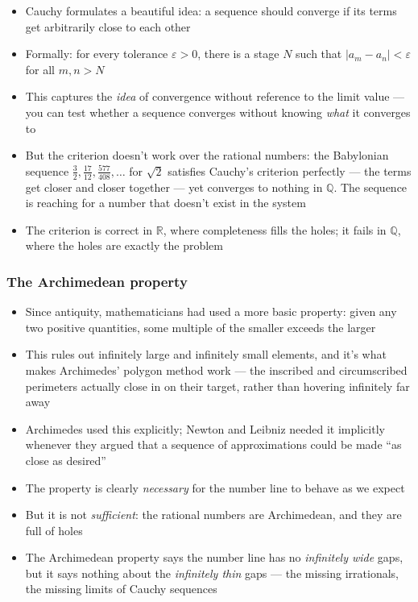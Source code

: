 \documentclass[
  10pt,
  letterpaper,
]{scrbook}
\providecommand{\tightlist}{%
  \setlength{\itemsep}{0pt}\setlength{\parskip}{0pt}}
\newcommand{\QQ}{\mathbb{Q}}
\newcommand{\RR}{\mathbb{R}}
\begin{document}
\begin{itemize}
\tightlist
\item
  Cauchy formulates a beautiful idea: a sequence should converge if its
  terms get arbitrarily close to each other
\item
  Formally: for every tolerance \(\varepsilon > 0\), there is a stage
  \(N\) such that \(|a_m - a_n| < \varepsilon\) for all \(m, n > N\)
\item
  This captures the \emph{idea} of convergence without reference to the
  limit value --- you can test whether a sequence converges without
  knowing \emph{what} it converges to
\item
  But the criterion doesn't work over the rational numbers: the
  Babylonian sequence
  \(\frac{3}{2}, \frac{17}{12}, \frac{577}{408}, \ldots\) for
  \(\sqrt{2}\) satisfies Cauchy's criterion perfectly --- the terms get
  closer and closer together --- yet converges to nothing in \(\QQ\).
  The sequence is reaching for a number that doesn't exist in the system
\item
  The criterion is correct in \(\RR\), where completeness fills the
  holes; it fails in \(\QQ\), where the holes are exactly the problem
\end{itemize}

\subsubsection*{The Archimedean
property}\label{the-archimedean-property}

\begin{itemize}
\tightlist
\item
  Since antiquity, mathematicians had used a more basic property: given
  any two positive quantities, some multiple of the smaller exceeds the
  larger
\item
  This rules out infinitely large and infinitely small elements, and
  it's what makes Archimedes' polygon method work --- the inscribed and
  circumscribed perimeters actually close in on their target, rather
  than hovering infinitely far away
\item
  Archimedes used this explicitly; Newton and Leibniz needed it
  implicitly whenever they argued that a sequence of approximations
  could be made ``as close as desired''
\item
  The property is clearly \emph{necessary} for the number line to behave
  as we expect
\item
  But it is not \emph{sufficient}: the rational numbers are Archimedean,
  and they are full of holes
\item
  The Archimedean property says the number line has no \emph{infinitely
  wide} gaps, but it says nothing about the \emph{infinitely thin} gaps
  --- the missing irrationals, the missing limits of Cauchy sequences
\end{itemize}
\end{document}
